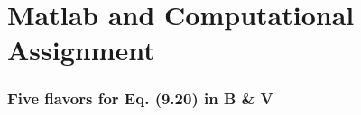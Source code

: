 \documentclass[11pt,a4paper]{article}
\begin{document}
\begin{titlepage}
    \maketitle
\end{titlepage}
\renewcommand{\contentsname}{Table of Contents}
\begin{center} 
    \tableofcontents 
    \listoffigures
\end{center}
\newpage

\part{Matlab and Computational Assignment}
\section{Five flavors for Eq. (9.20) in B \& V}
\end{document}
